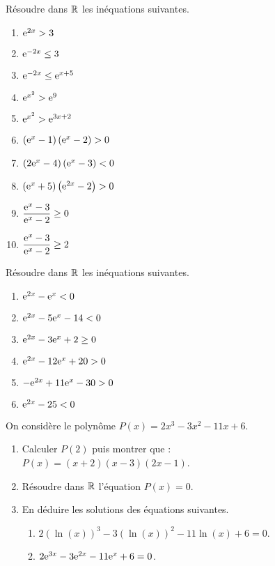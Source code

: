    \begin{exercice}
    Résoudre dans $ \mathbb{R} $  les inéquations suivantes.
   
\begin{enumerate}
\item $\mathrm{e}^{2x}>3 $  
\item $ \mathrm{e}^{-2x}\leq 3$  
\item  $ \mathrm{e}^{-2x}\leq\mathrm{e}^{x+5} $  
\item $ \mathrm{e}^{x^{2}}>\mathrm{e}^{9}$ 
\item  $ \mathrm{e}^{x^{2}}>\mathrm{e}^{3x+2}  $ 
\item   $\left(\mathrm{e}^{x}-1\right)\left(\mathrm{e}^{x}-2\right)>0 $ 
\item   $\left(2\mathrm{e}^{x}-4\right)\left(\mathrm{e}^{x}-3\right)<0 $ 
\item $\left(\mathrm{e}^{x}+5\right)\left(\mathrm{e}^{2x}-2\right)>0 $
\item $ \dfrac{\mathrm{e}^{x}-3}{\mathrm{e}^{x}-2}\geq0 $ 
\item $ \dfrac{\mathrm{e}^{x}-3}{\mathrm{e}^{x}-2}\geq2 $ 
\end{enumerate}

  \end{exercice}
  
  \begin{exercice}
Résoudre dans $ \mathbb{R} $  les inéquations suivantes.
  
\begin{enumerate}
\item $ \mathrm{e}^{2x}-\mathrm{e}^{x}<0$   
\item $ \mathrm{e}^{2x}-5\mathrm{e}^{x}-14<0$    
\item $ \mathrm{e}^{2x}-3\mathrm{e}^{x}+2\geq0$ 
\item $ \mathrm{e}^{2x}-12\mathrm{e}^{x}+20>0$ 
\item $ -\mathrm{e}^{2x}+11\mathrm{e}^{x}-30>0$ 
\item $ \mathrm{e}^{2x}-25<0$ 
\end{enumerate}

 \end{exercice}

   \begin{exercice}
  On considère le polynôme $ P(x)=2x^{3}-3x^{2}-11x+6$.
\begin{enumerate}
\item Calculer  $ P(2) $  puis montrer que :\\ $ P(x)=(x+2)(x-3)(2x-1) $.
\item Résoudre dans $ \mathbb{R} $  l'équation $ P(x)=0 $.
\item En déduire les  solutions des équations  suivantes.
\begin{enumerate}
\item $ 2(\ln(x))^{3}-3(\ln(x))^{2}-11\ln(x)+6=0 $.
\item $ 2\mathrm{e}^{3x}-3\mathrm{e}^{2x}-11\mathrm{e}^{x}+6=0 $.

\end{enumerate}
\end{enumerate}
 \end{exercice}
 
